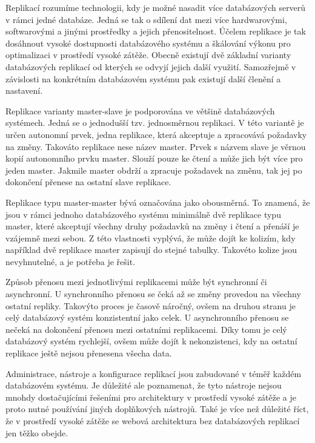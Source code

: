 \documentclass[12pt]{article}
\begin{document}
Replikací rozumíme technologii, kdy je možné nasadit více databázových serverů v rámci jedné databáze. Jedná se tak o sdílení dat mezi více hardwarovými, softwarovými a jinými prostředky a jejich přenositelnost. Účelem replikace je tak dosáhnout vysoké dostupnosti databázového systému a škálování výkonu pro optimalizaci v prostředí vysoké zátěže. Obecně existují dvě základní varianty databázových replikací od kterých se odvyjí jejich další využití. Samozřejmě v závislosti na konkrétním databázovém systému pak existují další členění a nastavení. 

Replikace varianty master-slave je podporována ve většině databázových systémech. Jedná se o jednodušší tzv. jednosměrnou replikaci. V této variantě je určen autonomní prvek, jedna replikace, která akceptuje a zpracovává požadavky na změny. Takováto replikace nese název master. Prvek s názvem slave je věrnou kopií autonomního prvku master. Slouží pouze ke čtení a může jich být více pro jeden master. Jakmile master obdrží a zpracuje požadavek na změnu, tak jej po dokončení přenese na ostatní slave replikace.

Replikace typu master-master bývá označována jako obousměrná. To znamená, že jsou v rámci jednoho databázového systému minimálně dvě replikace typu master, které akceptují všechny druhy požadavků na změny i čtení a přenáší je vzájemně mezi sebou. Z této vlastnosti vyplývá, že může dojít ke kolizím, kdy například dvě replikace master zapisují do stejné tabulky. Takovéto kolize jsou nevyhnutelné, a je potřeba je řešit.

Způsob přenosu mezi jednotlivými replikacemi může být synchronní či asynchronní. U synchronního přenosu se čeká až se změny provedou na všechny ostatní repliky. Takovýto proces je časově náročný, ovšem na druhou stranu je celý databázový systém konzistentní jako celek. U asynchronního přenosu se nečeká na dokončení přenosu mezi ostatními replikacemi. Díky tomu je celý databázový systém rychlejší, ovšem může dojít k nekonzistenci, kdy na ostatní replikace ještě nejsou přenesena všecha data.

Administrace, nástroje a konfigurace replikací jsou zabudované v téměř každém databázovém systému. Je důležité ale poznamenat, že tyto nástroje nejsou mnohdy dostačujícími řešeními pro architektury v prostředí vysoké zátěže a je proto nutné používání jiných doplňkových nástrojů. Také je více než důležité říct, že v prostředí vysoké zátěže se webová architektura bez databázových replikací jen těžko obejde.\cite{replikace}
\end{document}
